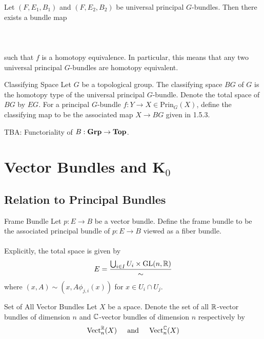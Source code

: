 \documentclass[a4paper]{article}
\begin{document}
\begin{thm}{}{} Let $(F,E_1,B_1)$ and $(F,E_2,B_2)$ be universal principal $G$-bundles. Then there exists a bundle map \\~\\
\\~\\
such that $f$ is a homotopy equivalence. In particular, this means that any two universal principal $G$-bundles are homotopy equivalent. 
\end{thm}

\begin{defn}{Classifying Space}{} Let $G$ be a topological group. The classifying space $BG$ of $G$ is the homotopy type of the universal principal $G$-bundle. Denote the total space of $BG$ by $EG$. For a principal $G$-bundle $f:Y\to X\in\text{Prin}_G(X)$, define the classifying map to be the associated map $X\to BG$ given in 1.5.3. 
\end{defn}

TBA: Functoriality of $B:\bold{Grp}\to\bold{Top}$. 

\pagebreak
\section{Vector Bundles and K${_0}$}
\subsection{Relation to Principal Bundles}
\begin{defn}{Frame Bundle}{} Let $p:E\to B$ be a vector bundle. Define the frame bundle to be the associated principal bundle of $p:E\to B$ viewed as a fiber bundle. \\~\\

Explicitly, the total space is given by $$E=\frac{\bigcup_{i\in I}U_i\times\text{GL}(n,\mathbb{R})}{\sim}$$ where $(x,A)\sim(x,A\phi_{j,i}(x))$ for $x\in U_i\cap U_j$. 
\end{defn}

\begin{defn}{Set of All Vector Bundles}{} Let $X$ be a space. Denote the set of all $\mathbb{R}$-vector bundles of dimension $n$ and $\mathbb{C}$-vector bundles of dimension $n$ respectively by $$\text{Vect}_n^{\mathbb{R}}(X)\;\;\;\;\text{ and }\;\;\;\;\text{Vect}_n^{\mathbb{C}}(X)$$
\end{defn}
\end{document}
